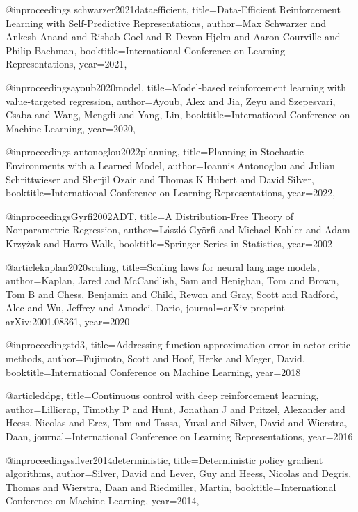 @inproceedings{
schwarzer2021dataefficient,
title={Data-Efficient Reinforcement Learning with Self-Predictive Representations},
author={Max Schwarzer and Ankesh Anand and Rishab Goel and R Devon Hjelm and Aaron Courville and Philip Bachman},
booktitle={International Conference on Learning Representations},
year={2021},
}

@inproceedings{ayoub2020model,
  title={Model-based reinforcement learning with value-targeted regression},
  author={Ayoub, Alex and Jia, Zeyu and Szepesvari, Csaba and Wang, Mengdi and Yang, Lin},
  booktitle={International Conference on Machine Learning},
  year={2020},
}

@inproceedings{
antonoglou2022planning,
title={Planning in Stochastic Environments with a Learned Model},
author={Ioannis Antonoglou and Julian Schrittwieser and Sherjil Ozair and Thomas K Hubert and David Silver},
booktitle={International Conference on Learning Representations},
year={2022},
}

@inproceedings{Gyrfi2002ADT,
  title={A Distribution-Free Theory of Nonparametric Regression},
  author={L{\'a}szl{\'o} Gy{\"o}rfi and Michael Kohler and Adam Krzyżak and Harro Walk},
  booktitle={Springer Series in Statistics},
  year={2002}
}

@article{kaplan2020scaling,
  title={Scaling laws for neural language models},
  author={Kaplan, Jared and McCandlish, Sam and Henighan, Tom and Brown, Tom B and Chess, Benjamin and Child, Rewon and Gray, Scott and Radford, Alec and Wu, Jeffrey and Amodei, Dario},
  journal={arXiv preprint arXiv:2001.08361},
  year={2020}
}

@inproceedings{td3,
  title={Addressing function approximation error in actor-critic methods},
  author={Fujimoto, Scott and Hoof, Herke and Meger, David},
  booktitle={International Conference on Machine Learning},
  year={2018}
}

@article{ddpg,
  title={Continuous control with deep reinforcement learning},
  author={Lillicrap, Timothy P and Hunt, Jonathan J and Pritzel, Alexander and Heess, Nicolas and Erez, Tom and Tassa, Yuval and Silver, David and Wierstra, Daan},
  journal={International Conference on Learning Representations},
  year={2016}
}

@inproceedings{silver2014deterministic,
  title={Deterministic policy gradient algorithms},
  author={Silver, David and Lever, Guy and Heess, Nicolas and Degris, Thomas and Wierstra, Daan and Riedmiller, Martin},
  booktitle={International Conference on Machine Learning},
  year={2014},
}


